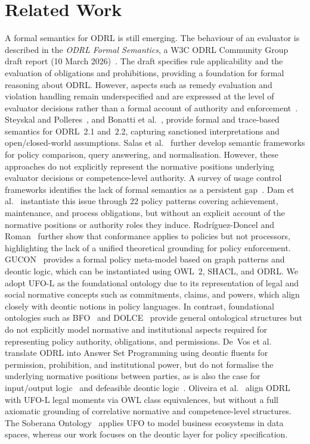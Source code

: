 \documentclass{IOS-Book-Article}
\theoremstyle{definition}
\begin{document}
\section{Related Work}
\label{sec:related}
A formal semantics for ODRL is still emerging. The behaviour of an evaluator is described in the \emph{ODRL Formal Semantics}, a W3C ODRL Community Group draft report (10 March 2026)~\cite{odrl-formal-semantics}. The draft specifies rule applicability and the evaluation of obligations and prohibitions, providing a foundation for formal reasoning about ODRL. However, aspects such as remedy evaluation and violation handling remain underspecified and are expressed at the level of evaluator decisions rather than a formal account of authority and enforcement~\cite{odrl-formal-semantics}. Steyskal and Polleres~\cite{steyskal2015odrl}, and Bonatti et al.~\cite{bonatti2025odrl}, provide formal and trace-based semantics for ODRL~2.1 and~2.2, capturing sanctioned interpretations and open/closed-world assumptions. Salas et al.~\cite{salas2026normalisation,salas2025odrl} further develop semantic frameworks for policy comparison, query answering, and normalisation. However, these approaches do not explicitly represent the normative positions underlying evaluator decisions or competence-level authority. A survey of usage control frameworks identifies the lack of formal semantics as a persistent gap~\cite{akaichi2022usagecontrolspecificationenforcement}. Dam et al.~\cite{dam2023policy} instantiate this issue through 22 policy patterns covering achievement, maintenance, and process obligations, but without an explicit account of the normative positions or authority roles they induce. Rodríguez-Doncel and Roman~\cite{rodriguez2025conformance} further show that conformance applies to policies but not processors, highlighting the lack of a unified theoretical grounding for policy enforcement. GUCON~\cite{akaichi2023gucon} provides a formal policy meta-model based on graph patterns and deontic logic, which can be instantiated using OWL~2, SHACL, and ODRL. We adopt UFO-L as the foundational ontology due to its representation of legal and social normative concepts such as commitments, claims, and powers, which align closely with deontic notions in policy languages. In contrast, foundational ontologies such as BFO~\cite{Otte2022BFOBF} and DOLCE~\cite{gangemi2002sweetening} provide general ontological structures but do not explicitly model normative and institutional aspects required for representing policy authority, obligations, and permissions. De~Vos et al.~\cite{devos2019odrl} translate ODRL into Answer Set
Programming using deontic fluents for permission, prohibition, and
institutional power, but do not formalise the underlying normative
positions between parties, as is also the case for input/output
logic~\cite{makinson2000inputoutput} and defeasible deontic
logic~\cite{Governatori2013-GOVCSA}. Oliveira et al.~\cite{oliveira2024legion} align ODRL with UFO-L legal moments via OWL class equivalences, but without a full axiomatic grounding of correlative normative and competence-level structures. The Soberana Ontology~\cite{cunha2025soberana} applies UFO to model business ecosystems in data spaces, whereas our work focuses on the deontic layer for policy specification.
\end{document}
